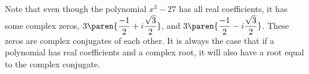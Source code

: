 Note that even though the polynomial $x^{3}-27$ has all real coefficients,
it has some complex zeros, $3\paren{\displaystyle
\frac{-1}{2}+i\displaystyle\frac{\sqrt{3}}{2}}$, and $3\paren{
\displaystyle\frac{-1}{2}-i\displaystyle\frac{\sqrt{3}}{2}}$. 
These zeros are complex conjugates of each other. It is always the case that if a polynomial has real 
coefficients and a complex root, it will also
have a root equal to the complex conjugate.
